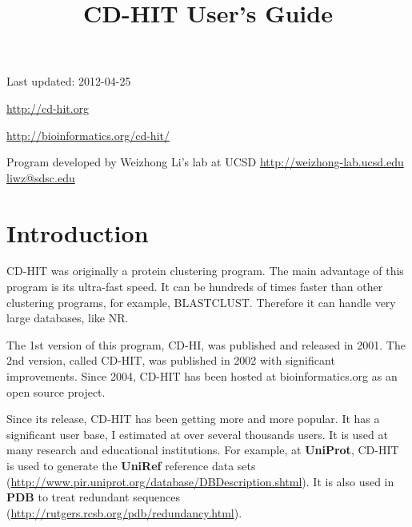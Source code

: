 \documentclass[12pt,a4paper]{article}
\title{CD-HIT User's Guide }
\date{}
\begin{document}
\maketitle
\vspace{10em}
\begin{center}

Last updated: 2012-04-25

\href{http:\slash \slash cd-hit.org}{http:\slash \slash cd-hit.org}

\href{http:\slash \slash bioinformatics.org\slash cd-hit\slash }{http:\slash \slash bioinformatics.org\slash cd-hit\slash }

Program developed by Weizhong Li's lab at UCSD \href{http:\slash \slash weizhong-lab.ucsd.edu}{http:\slash \slash weizhong-lab.ucsd.edu} \href{liwz@sdsc.edu}{liwz@sdsc.edu}

\end{center}

\clearpage
\tableofcontents
\clearpage

\clearpage
\section{Introduction }

CD-HIT was originally a protein clustering program. The main advantage of this program is its ultra-fast speed. It can be hundreds of times faster than other clustering programs, for example, BLASTCLUST. Therefore it can handle very large databases, like NR.

The 1st version of this program, CD-HI, was published and released in 2001. The 2nd version, called CD-HIT, was published in 2002 with significant improvements. Since 2004, CD-HIT has been hosted at bioinformatics.org as an open source project.

Since its release, CD-HIT has been getting more and more popular. It has a significant user base, I estimated at over several thousands users. It is used at many research and educational institutions. For example, at {\bf UniProt}, CD-HIT is used to generate the {\bf UniRef} reference data sets (\href{http:\slash \slash www.pir.uniprot.org\slash database\slash DBDescription.shtml}{http:\slash \slash www.pir.uniprot.org\slash database\slash DBDescription.shtml}). It is also used in {\bf PDB} to treat redundant sequences (\href{http:\slash \slash rutgers.rcsb.org\slash pdb\slash redundancy.html}{http:\slash \slash rutgers.rcsb.org\slash pdb\slash redundancy.html}).
\end{document}
